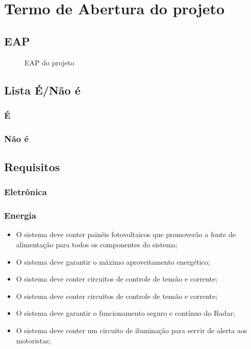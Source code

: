 \chapter{Termo de Abertura do projeto}

\section{EAP}
\begin{figure}[!htb]
    \caption{\label{fig:eap} EAP do projeto}
\end{figure}
\section{Lista É/Não é}
\subsection{É}
\subsection{Não é}
\section{Requisitos}
\subsection{Eletrônica}
\subsection{Energia}
\begin{itemize}
	\item O sistema deve conter painéis fotovoltaicos que promoverão a fonte de alimentação para todos os componentes do sistema;
	\item O sistema deve garantir o máximo aproveitamento energético;
	\item O sistema deve conter circuitos de controle de tensão e corrente;
	\item O sistema deve conter circuitos de controle de tensão e corrente;
	\item O sistema deve garantir o funcionamento seguro e contínuo do Radar;
	\item O sistema deve conter um circuito de iluminação para servir de alerta aos motoristas;
	\end{itemize}


